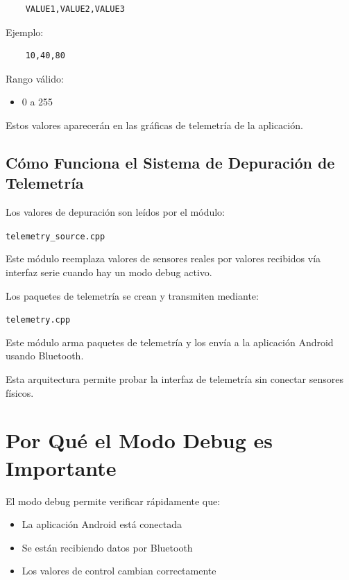 \begin{verbatim}
    VALUE1,VALUE2,VALUE3
\end{verbatim}

Ejemplo:

\begin{verbatim}
    10,40,80
\end{verbatim}

Rango válido:

\begin{itemize}
    \item 0 a 255
\end{itemize}

Estos valores aparecerán en las gráficas de telemetría de la aplicación.

\subsection{Cómo Funciona el Sistema de Depuración de Telemetría}

Los valores de depuración son leídos por el módulo:

\begin{center}
    \texttt{telemetry\_source.cpp}
\end{center}

Este módulo reemplaza valores de sensores reales por valores recibidos vía interfaz serie cuando hay un modo debug activo.

Los paquetes de telemetría se crean y transmiten mediante:

\begin{center}
    \texttt{telemetry.cpp}
\end{center}

Este módulo arma paquetes de telemetría y los envía a la aplicación Android usando Bluetooth.

Esta arquitectura permite probar la interfaz de telemetría sin conectar sensores físicos.

\section{Por Qué el Modo Debug es Importante}

El modo debug permite verificar rápidamente que:

\begin{itemize}
    \item La aplicación Android está conectada
    \item Se están recibiendo datos por Bluetooth
    \item Los valores de control cambian correctamente
\end{itemize}

